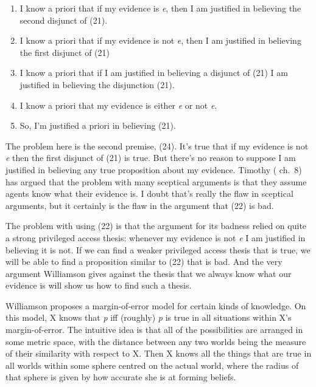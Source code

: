 \documentclass[
  11pt,
  letterpaper,
  DIV=11,
  numbers=noendperiod,
  oneside]{scrartcl}
\begin{document}
\begin{enumerate}
\def\labelenumi{\arabic{enumi}.}
\setcounter{enumi}{22}
\item
  I know a priori that if my evidence is \emph{e}, then I am justified
  in believing the second disjunct of (21).
\item
  I know a priori that if my evidence is not \emph{e}, then I am
  justified in believing the first disjunct of (21)
\item
  I know a priori that if I am justified in believing a disjunct of (21)
  I am justified in believing the disjunction (21).
\item
  I know a priori that my evidence is either \emph{e} or not \emph{e}.
\item
  So, I'm justified a priori in believing (21).
\end{enumerate}

The problem here is the second premise, (24). It's true that if my
evidence is not \emph{e} then the first disjunct of (21) is true. But
there's no reason to suppose I am justified in believing any true
proposition about my evidence. Timothy
( ch.~8) has argued
that the problem with many sceptical arguments is that they assume
agents know what their evidence is. I doubt that's really the flaw in
sceptical arguments, but it certainly is the flaw in the argument that
(22) is bad.

The problem with using (22) is that the argument for its badness relied
on quite a strong privileged access thesis: whenever my evidence is not
\emph{e} I am justified in believing it is not. If we can find a weaker
privileged access thesis that is true, we will be able to find a
proposition similar to (22) that is bad. And the very argument
Williamson gives against the thesis that we always know what our
evidence is will show us how to find such a thesis.

Williamson proposes a margin-of-error model for certain kinds of
knowledge. On this model, X knows that \emph{p} iff (roughly) \emph{p}
is true in all situations within X's margin-of-error. The intuitive idea is
that all of the possibilities are arranged in some metric space, with
the distance between any two worlds being the measure of their
similarity with respect to X. Then X knows all the things that are true
in all worlds within some sphere centred on the actual world, where the
radius of that sphere is given by how accurate she is at forming
beliefs.
\end{document}
